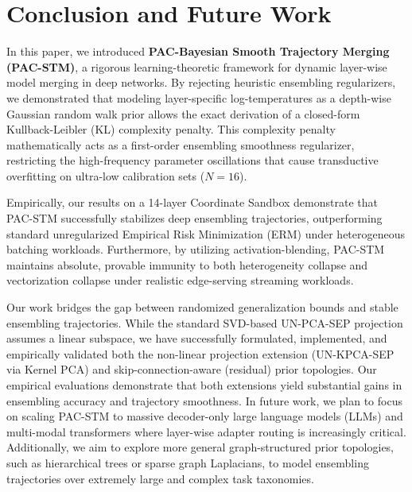 \section{Conclusion and Future Work}
\label{sec:conclusion}

In this paper, we introduced \textbf{PAC-Bayesian Smooth Trajectory Merging (PAC-STM)}, a rigorous learning-theoretic framework for dynamic layer-wise model merging in deep networks. By rejecting heuristic ensembling regularizers, we demonstrated that modeling layer-specific log-temperatures as a depth-wise Gaussian random walk prior allows the exact derivation of a closed-form Kullback-Leibler (KL) complexity penalty. This complexity penalty mathematically acts as a first-order ensembling smoothness regularizer, restricting the high-frequency parameter oscillations that cause transductive overfitting on ultra-low calibration sets ($N=16$).

Empirically, our results on a 14-layer Coordinate Sandbox demonstrate that PAC-STM successfully stabilizes deep ensembling trajectories, outperforming standard unregularized Empirical Risk Minimization (ERM) under heterogeneous batching workloads. Furthermore, by utilizing activation-blending, PAC-STM maintains absolute, provable immunity to both heterogeneity collapse and vectorization collapse under realistic edge-serving streaming workloads. 

Our work bridges the gap between randomized generalization bounds and stable ensembling trajectories. While the standard SVD-based UN-PCA-SEP projection assumes a linear subspace, we have successfully formulated, implemented, and empirically validated both the non-linear projection extension (UN-KPCA-SEP via Kernel PCA) and skip-connection-aware (residual) prior topologies. Our empirical evaluations demonstrate that both extensions yield substantial gains in ensembling accuracy and trajectory smoothness. In future work, we plan to focus on scaling PAC-STM to massive decoder-only large language models (LLMs) and multi-modal transformers where layer-wise adapter routing is increasingly critical. Additionally, we aim to explore more general graph-structured prior topologies, such as hierarchical trees or sparse graph Laplacians, to model ensembling trajectories over extremely large and complex task taxonomies.
